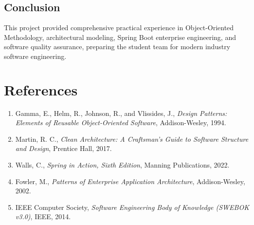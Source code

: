 \documentclass[12pt,a4paper,oneside]{report}
\begin{document}
\section{Conclusion}
This project provided comprehensive practical experience in Object-Oriented Methodology, architectural modeling, Spring Boot enterprise engineering, and software quality assurance, preparing the student team for modern industry software engineering.

\chapter*{References}
\begin{enumerate}
    \item Gamma, E., Helm, R., Johnson, R., and Vlissides, J., \textit{Design Patterns: Elements of Reusable Object-Oriented Software}, Addison-Wesley, 1994.
    \item Martin, R. C., \textit{Clean Architecture: A Craftsman's Guide to Software Structure and Design}, Prentice Hall, 2017.
    \item Walls, C., \textit{Spring in Action, Sixth Edition}, Manning Publications, 2022.
    \item Fowler, M., \textit{Patterns of Enterprise Application Architecture}, Addison-Wesley, 2002.
    \item IEEE Computer Society, \textit{Software Engineering Body of Knowledge (SWEBOK v3.0)}, IEEE, 2014.
\end{enumerate}

\appendix
\end{document}
